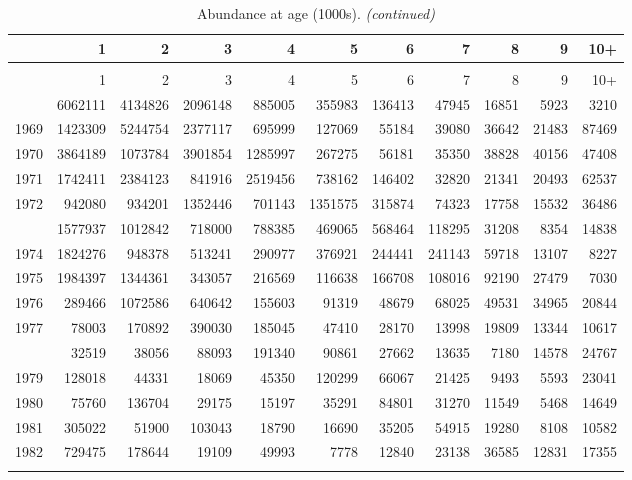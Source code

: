 \documentclass[
]{article}
\begin{document}
\begin{longtable}[t]{lrrrrrrrrrr}
\caption{\label{tab:NAA-table}Abundance at age (1000s).}\\
\toprule
  & 1 & 2 & 3 & 4 & 5 & 6 & 7 & 8 & 9 & 10+\\
\midrule
\endfirsthead
\caption[]{Abundance at age (1000s). \textit{(continued)}}\\
\toprule
  & 1 & 2 & 3 & 4 & 5 & 6 & 7 & 8 & 9 & 10+\\
\midrule
\endhead

\endfoot
\bottomrule
\endlastfoot
1968 & 6062111 & 4134826 & 2096148 & 885005 & 355983 & 136413 & 47945 & 16851 & 5923 & 3210\\
1969 & 1423309 & 5244754 & 2377117 & 695999 & 127069 & 55184 & 39080 & 36642 & 21483 & 87469\\
1970 & 3864189 & 1073784 & 3901854 & 1285997 & 267275 & 56181 & 35350 & 38828 & 40156 & 47408\\
1971 & 1742411 & 2384123 & 841916 & 2519456 & 738162 & 146402 & 32820 & 21341 & 20493 & 62537\\
1972 & 942080 & 934201 & 1352446 & 701143 & 1351575 & 315874 & 74323 & 17758 & 15532 & 36486\\
\addlinespace
1973 & 1577937 & 1012842 & 718000 & 788385 & 469065 & 568464 & 118295 & 31208 & 8354 & 14838\\
1974 & 1824276 & 948378 & 513241 & 290977 & 376921 & 244441 & 241143 & 59718 & 13107 & 8227\\
1975 & 1984397 & 1344361 & 343057 & 216569 & 116638 & 166708 & 108016 & 92190 & 27479 & 7030\\
1976 & 289466 & 1072586 & 640642 & 155603 & 91319 & 48679 & 68025 & 49531 & 34965 & 20844\\
1977 & 78003 & 170892 & 390030 & 185045 & 47410 & 28170 & 13998 & 19809 & 13344 & 10617\\
\addlinespace
1978 & 32519 & 38056 & 88093 & 191340 & 90861 & 27662 & 13635 & 7180 & 14578 & 24767\\
1979 & 128018 & 44331 & 18069 & 45350 & 120299 & 66067 & 21425 & 9493 & 5593 & 23041\\
1980 & 75760 & 136704 & 29175 & 15197 & 35291 & 84801 & 31270 & 11549 & 5468 & 14649\\
1981 & 305022 & 51900 & 103043 & 18790 & 16690 & 35205 & 54915 & 19280 & 8108 & 10582\\
1982 & 729475 & 178644 & 19109 & 49993 & 7778 & 12840 & 23138 & 36585 & 12831 & 17355\\
\addlinespace

\end{longtable}
\end{document}
